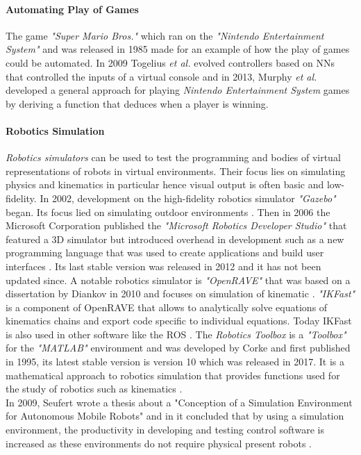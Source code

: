 \paragraph{Automating Play of Games}
The game \textit{"Super Mario Bros."} which ran on the \textit{"Nintendo Entertainment System"} and was released in 1985 made for an example of how the play of games could be automated. In 2009 Togelius \textit{et al.} evolved controllers based on \acp{NN} that controlled the inputs of a virtual console and in 2013, Murphy \textit{et al.} developed a general approach for playing \textit{Nintendo Entertainment System} games by deriving a function that deduces when a player is winning\cite{5286481}\cite{Tom13thefirst}. 

\paragraph{Robotics Simulation}
\emph{Robotics simulators} can be used to test the programming and bodies of virtual representations of robots in virtual environments. Their focus lies on simulating physics and kinematics in particular hence visual output is often basic and low-fidelity. In 2002, development on the high-fidelity robotics simulator \emph{"Gazebo"} began. Its focus lied on simulating outdoor environments \cite{Staranowicz2011}\cite{Gazebo}. Then in 2006 the Microsoft Corporation published the \emph{"Microsoft Robotics Developer Studio"} that featured a 3D simulator but introduced overhead in development such as a new programming language that was used to create applications and build user interfaces \cite{MRDS}. Its last stable version was released in 2012 and it has not been updated since. A notable robotics simulator is \emph{"OpenRAVE"} that was based on a dissertation by Diankov in 2010 and focuses on simulation of kinematic \cite{openRAVE}\cite{diankov_thesis}. \emph{"IKFast"} is a component of OpenRAVE that allows to analytically solve equations of kinematics chains and export code specific to individual equations. Today IKFast is also used in other software like the \ac{ROS} \cite{moveitikfast}.
The \emph{Robotics Toolbox} is a \emph{"Toolbox"} for the \emph{"MATLAB"} environment and was developed by Corke and first published in 1995, its latest stable version is version 10 which was released in 2017. It is a mathematical approach to robotics simulation that provides functions used for the study of robotics such as kinematics \cite{CorkePaper1995}\cite{CorkePaper1996}\cite{CorkematlabRoboticsToolboxBlog}.\\
In 2009, Seufert wrote a thesis about a "Conception of a Simulation Environment for Autonomous Mobile Robots" and in it concluded that by using a simulation environment, the productivity in developing and testing control software is increased as these environments do not require physical present robots \cite{Seufert2009}.
